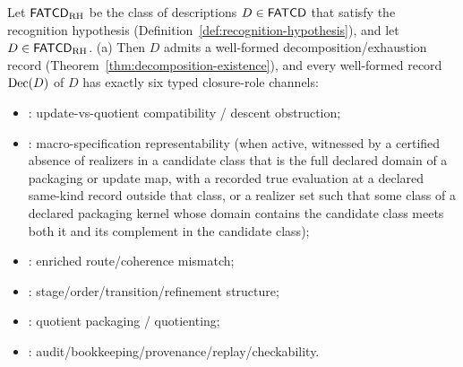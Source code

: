 \begin{theorem}\label{thm:scoped-exact-six}
Let \(\mathsf{FATCD}_{\mathrm{RH}}\) be the class of descriptions \(D \in \mathsf{FATCD}{}\)
that satisfy the recognition hypothesis
(Definition~\ref{def:recognition-hypothesis}), and let
\(D\in\mathsf{FATCD}_{\mathrm{RH}}\). \textup{(a)} Then \(D\) admits a well-formed
decomposition/exhaustion record (Theorem~\ref{thm:decomposition-existence}),
and every well-formed record \(\operatorname{Dec}\!\left(D\right)\) of \(D\) has exactly six typed
closure-role channels:
\begin{itemize}[topsep=2pt,itemsep=1pt]
  \item \Pone{}: update-vs-quotient compatibility / descent obstruction;
  \item \Ptwo{}: macro-specification representability (when active, witnessed by a certified absence
    of realizers in a candidate class that is the full declared domain of a
    packaging or update map, with a recorded true evaluation at a declared
    same-kind record outside that class, or a realizer set such that some class of a declared
    packaging kernel whose domain contains the candidate class meets both
    it and its complement in the candidate class);
  \item \Pthree{}: enriched route/coherence mismatch;
  \item \Pfour{}: stage/order/transition/refinement structure;
  \item \Pfive{}: quotient packaging / quotienting;
  \item \Psix{}: audit/bookkeeping/provenance/replay/checkability.
\end{itemize}


\end{theorem}
